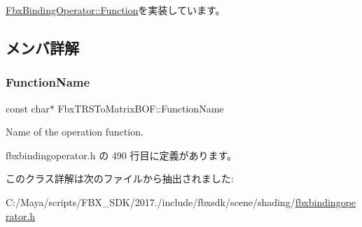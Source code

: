 \hyperlink{class_fbx_binding_operator_1_1_function_a9bbeec993a6e453a6569e7f40a85fd52}{Fbx\+Binding\+Operator\+::\+Function}を実装しています。



\subsection{メンバ詳解}
\mbox{\label{class_fbx_t_r_s_to_matrix_b_o_f_a91c277c5be0b7fef6081446541badd1a}} 
\subsubsection{\texorpdfstring{Function\+Name}{FunctionName}}
{\footnotesize\ttfamily const char$\ast$ Fbx\+T\+R\+S\+To\+Matrix\+B\+O\+F\+::\+Function\+Name\hspace{0.3cm}{\ttfamily [static]}}



Name of the operation function. 



 fbxbindingoperator.\+h の 490 行目に定義があります。



このクラス詳解は次のファイルから抽出されました\+:\begin{DoxyCompactItemize}
\item 
C\+:/\+Maya/scripts/\+F\+B\+X\+\_\+\+S\+D\+K/2017./include/fbxsdk/scene/shading/\hyperlink{fbxbindingoperator_8h}{fbxbindingoperator.\+h}\end{DoxyCompactItemize}
